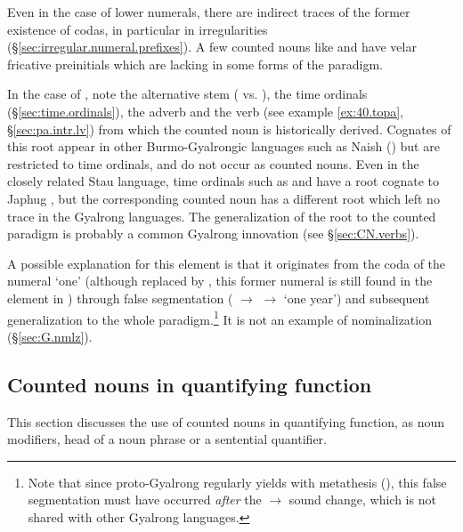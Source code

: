Even in the case of lower numerals, there are indirect traces of the former existence of codas, in particular in irregularities (§\ref{sec:irregular.numeral.prefixes}). A few counted nouns like  and  have velar fricative preinitials  which are lacking in some forms of the paradigm. 

In the case of , note the alternative stem  ( vs. ), the time ordinals (§\ref{sec:time.ordinals}), the adverb  and the verb   (see example \ref{ex:40.topa}, §\ref{sec:pa.intr.lv}) from which the counted noun  is historically derived. Cognates of this root  appear in other Burmo-Gyalrongic languages such as Naish (\citealt{jacques.michaud11naish}) but are restricted to time ordinals, and do not occur as counted nouns. Even in the closely related Stau language,  time ordinals such as  and  have a root  cognate to Japhug , but the corresponding counted noun  has a different root which left no trace in the Gyalrong languages. The generalization of the  root to the counted paradigm is probably a common Gyalrong innovation (see §\ref{sec:CN.verbs}). 

A possible explanation for this  element is that it originates from the coda of the numeral `one' (although replaced by , this former numeral is still found in the element  in ) through false segmentation ( $\rightarrow$  $\rightarrow$  `one year') and subsequent generalization to the whole paradigm.\footnote{Note that since proto-Gyalrong  regularly yields  with metathesis (\citealt[272]{jacques04these}), this false segmentation must have occurred \textit{after} the  $\rightarrow$ sound change, which is not shared with other Gyalrong languages. } It is not an example of  nominalization (§\ref{sec:G.nmlz}).


\subsection{Counted nouns in quantifying function} \label{sec:CN.quantifier}
This section discusses the use of counted nouns in  quantifying function, as noun modifiers, head of a noun phrase or a sentential quantifier.

